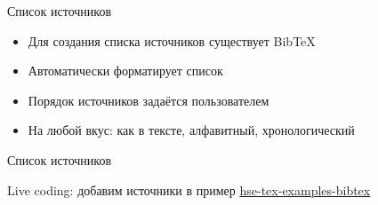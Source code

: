 
\begin{frame}{Список источников}

\begin{itemize}
    \item Для создания списка источников существует BibTeX
    \item Автоматически форматирует список
    \item Порядок источников задаётся пользователем
    \item На любой вкус: как в тексте, алфавитный, хронологический
\end{itemize}

\end{frame}


\begin{frame}{Список источников}

Live coding: добавим источники в пример
\href{https://www.overleaf.com/read/zhtwkwxsvshm}
     {\color{blue} hse-tex-examples-bibtex}

\end{frame}
